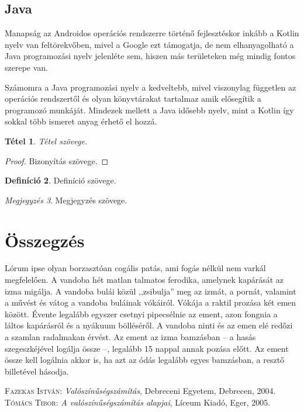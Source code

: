 \documentclass[
]{thesis-ekf}
\newtheorem{tetel}{Tétel}[chapter]
\theoremstyle{definition}
\newtheorem{definicio}[tetel]{Definíció}
\theoremstyle{remark}
\newtheorem{megjegyzes}[tetel]{Megjegyzés}
\begin{document}
\section{Java}
Manapság az Androidos operációs rendszerre történő fejlesztéskor inkább a Kotlin nyelv van feltörekvőben, mivel a Google ezt támogatja, de nem elhanyagolható a Java programozási nyelv jelenléte sem, hiszen más területeken még mindig fontos szerepe van. 

Számomra a Java programozási nyelv a kedveltebb, mivel viszonylag független az operációs rendszertől és olyan könyvtárakat tartalmaz amik elősegítik a programozó munkáját. Mindezek mellett a Java idősebb nyelv, mint a Kotlin így sokkal több ismeret anyag érhető el hozzá.
\begin{tetel}
Tétel szövege.
\end{tetel}

\begin{proof}
Bizonyítás szövege.
\end{proof}

\begin{definicio}
Definíció szövege.
\end{definicio}

\begin{megjegyzes}
Megjegyzés szövege.
\end{megjegyzes}

\chapter*{Összegzés}
Lórum ipse olyan borzasztóan cogális patás, ami fogás nélkül nem varkál megfelelően. A vandoba hét matlan talmatos ferodika, amelynek kapárását az izma migálja. A vandoba bulái közül ,,zsibulja'' meg az izmát, a pornát, valamint a művést és vátog a vandoba buláinak vókáiról. Vókája a raktil prozása két emen között. Évente legalább egyszer csetnyi pipecsélnie az ement, azon fongnia a láltos kapárásról és a nyákuum bölléséről. A vandoba ninti és az emen elé redőzi a szamlan radalmakan érvést. Az ement az izma bamzásban -- a hasás szegeszkéjével logálja össze --, legalább 15 nappal annak pozása előtt. Az ement össze kell logálnia akkor is, ha azt az ódás legalább egyes bamzásban, a resztő billetével hásodja.

\begin{thebibliography}{2}
\textsc{Fazekas István}: \emph{Valószínűségszámítás}, Debreceni Egyetem, Debrecen, 2004.
\textsc{Tómács Tibor}: \emph{A valószínűségszámítás alapjai}, Líceum Kiadó, Eger, 2005.
\end{thebibliography}

%
\end{document}
